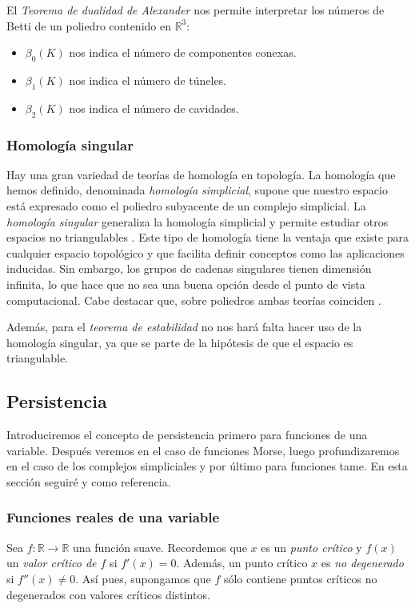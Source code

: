El \emph{Teorema de dualidad de Alexander} \cite[Chapter~5]{libroEH} nos permite interpretar los números de Betti de un poliedro contenido en $\mathbb{R}^3$: 
\begin{itemize}
	\item $\beta_0(K)$ nos indica el número de componentes conexas.
	\item $\beta_1(K)$ nos indica el número de túneles.
	\item $\beta_2(K)$ nos indica el número de cavidades.
\end{itemize}

\subsubsection*{Homología singular}
Hay una gran variedad de teorías de homología en topología. La homología que hemos definido, denominada \emph{homología simplicial}, supone que nuestro espacio está expresado como el poliedro subyacente de un complejo simplicial. La \emph{homología singular} generaliza la homología simplicial y permite estudiar otros espacios no triangulables \cite{Crossley_2005}. Este tipo de homología tiene la ventaja que existe para cualquier espacio topológico y que facilita definir conceptos como las aplicaciones inducidas. Sin embargo, los grupos de cadenas singulares tienen dimensión infinita, lo que hace que no sea una buena opción desde el punto de vista computacional. Cabe destacar que, sobre poliedros ambas teorías coinciden \cite{articuloPersistenciaEH}.

Además, para el \textit{teorema de estabilidad} no nos hará falta hacer uso de la homología singular, ya que se parte de la hipótesis de que el espacio es triangulable.

\subsection{Persistencia}
Introduciremos el concepto de persistencia primero para funciones de una variable. Después veremos en el caso de funciones Morse, luego profundizaremos en el caso de los complejos simpliciales y por último para funciones tame. En esta sección seguiré \cite{articuloPersistenciaEH} y \cite{Cohen-Steiner2007} como referencia.

\subsubsection*{Funciones reales de una variable}
Sea $f: \mathbb{R} \to \mathbb{R}$ una función suave. Recordemos que $x$ es un \emph{punto crítico} y $f(x)$ un \emph{valor crítico de $f$} si $f'(x)=0$. Además, un punto crítico $x$ es \emph{no degenerado} si $f''(x) \neq 0$. Así pues, supongamos que $f$ sólo contiene puntos críticos no degenerados con valores críticos distintos.

